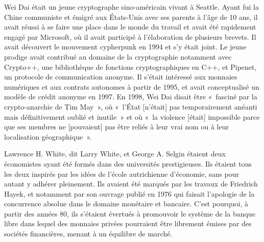 Wei Dai était un jeune cryptographe sino-américain vivant à Seattle. Ayant fui la Chine communiste et émigré aux États-Unis avec ses parents à l'âge de 10 ans, il avait réussi à se faire une place dans le monde du travail et avait été rapidement engagé par Microsoft, où il avait participé à l'élaboration de plusieurs brevets. Il avait découvert le mouvement cypherpunk en 1994 et s'y était joint. Le jeune prodige avait contribué au domaine de la cryptographie notamment avec Crypto++, une bibliothèque de fonctions cryptographiques en C++, et Pipenet, un protocole de communication anonyme. Il s'était intéressé aux monnaies numériques et aux contrats autonomes à partir de 1995, et avait conceptualisé un modèle de crédit anonyme en 1997. En 1998, Wei Dai disait être «~fasciné par la crypto-anarchie de Tim May~», où «~l'État [n'était] pas temporairement anéanti mais définitivement oublié et inutile~» et où «~la violence [était] impossible parce que ses membres ne [pouvaient] pas être reliés à leur vrai nom ou à leur localisation géographique~». %

Lawrence H. White, dit Larry White, et George A. Selgin étaient deux économistes ayant été formés dans des universités prestigieuses. Ils étaient tous les deux inspirés par les idées de l'école autrichienne d'économie, sans pour autant y adhérer pleinement. Ils avaient été marqués par les travaux de Friedrich Hayek, et notamment par son ouvrage  publié en 1976 qui faisait l'apologie de la concurrence absolue dans le domaine monétaire et bancaire. C'est pourquoi, à partir des années 80, ils s'étaient évertués à promouvoir le système de la banque libre dans lequel des monnaies privées pourraient être librement émises par des sociétés financières, menant à un équilibre de marché.

